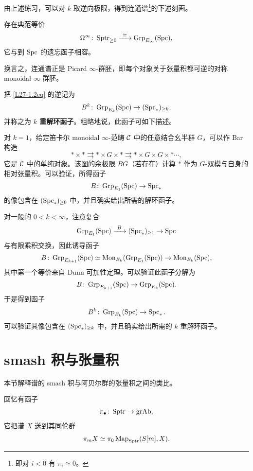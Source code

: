 \nitem\label{L27-1.10}
由上述练习，可以对 $k$ 取逆向极限，得到连通谱\footnote{即对 $i<0$ 有 $\pi_{i}\simeq 0$。}的下述刻画。

\begin{corollary}\label{L27-1.11}
存在典范等价
\[
\Omega^{\infty}\colon\Sptr_{\ge 0}\xrightarrow{\ \simeq\ }\Grp_{E_\infty}(\Spc),
\]
它与到 $\operatorname{Spc}$ 的遗忘函子相容。
\end{corollary}

\begin{remark}\label{L27-1.12}
换言之，连通谱正是 Picard $\infty$-群胚，即每个对象关于张量积都可逆的对称 monoidal $\infty$-群胚。
\end{remark}

\begin{remark}\label{L27-1.13}
把 \eqref{L27-1.2eq} 的逆记为
\[
B^{k}\colon\operatorname{Grp}_{E_k}(\operatorname{Spc})\to(\operatorname{Spc}_{*})_{\ge k},
\]
并称之为 \textbf{$k$ 重解环函子}。粗略地说，此函子可如下描述。

对 $k=1$，给定笛卡尔 monoidal $\infty$-范畴 $\mathcal{C}$ 中的任意结合幺半群 $G$，可以作 Bar 构造
\[
*\times *\rightrightarrows *\times G\times *\rightrightarrows *\times G\times G\times *\cdots,
\]
它是 $\mathcal{C}$ 中的单纯对象。该图的余极限 $BG$（若存在）计算 $*$ 作为 $G$-双模与自身的相对张量积。可以验证，所得函子
\[
B\colon\operatorname{Grp}_{E_1}(\operatorname{Spc})\to\operatorname{Spc}_{*}
\]
的像包含在 $(\operatorname{Spc}_{*})_{\ge 0}$ 中，并且确实给出所需的解环函子。

对一般的 $0<k<\infty$，注意复合
\[
\Grp_{E_1}(\Spc)\xrightarrow{\ B\ }(\Spc_{*})_{\ge 1}\to\Spc
\]
与有限乘积交换，因此诱导函子
\[
B\colon\operatorname{Grp}_{E_{k+1}}(\operatorname{Spc})\simeq\operatorname{Mon}_{E_k}(\operatorname{Grp}_{E_1}(\operatorname{Spc}))\to\operatorname{Mon}_{E_k}(\operatorname{Spc}),
\]
其中第一个等价来自 Dunn 可加性定理。可以验证此函子分解为
\[
B\colon\operatorname{Grp}_{E_{k+1}}(\operatorname{Spc})\to\operatorname{Grp}_{E_k}(\operatorname{Spc}).
\]
于是得到函子
\[
B^{k}\colon\operatorname{Grp}_{E_k}(\operatorname{Spc})\to\operatorname{Spc}_{*}.
\]
可以验证其像包含在 $(\operatorname{Spc}_{*})_{\ge k}$ 中，并且确实给出所需的 $k$ 重解环函子。
\end{remark}

\section{smash 积与张量积}

\nitem\label{L27-2.1}
本节解释谱的 smash 积与阿贝尔群的张量积之间的类比。

\nitem\label{L27-2.2}
回忆有函子
\[
\pi_{\bullet}\colon\operatorname{Sptr}\to\mathrm{grAb},
\]
它把谱 $X$ 送到其同伦群
\[
\pi_{m}X\simeq\pi_{0}\operatorname{Map}_{\operatorname{Sptr}}(S[m],X).
\]

